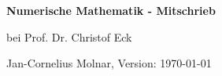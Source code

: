 \documentclass[paper=a5,fleqn,DIV=calc]{scrartcl}
\theoremstyle{graymarginwithblueheader}
\theoremstyle{graymarginwithyellowheader}
\theoremstyle{graymarginwithitblackheader}
\theoremstyle{graymarginwithblueheadern}
\theoremstyle{graymarginwithyellowheadern}
\theoremstyle{graymarginwithitblackheadern}
\begin{document}
\begin{center}
{\huge\bf Numerische Mathematik - Mitschrieb}

bei Prof. Dr. Christof Eck

Jan-Cornelius Molnar, Version: \today\ \thistime
\end{center}

\tableofcontents

\newpage


\newpage


\newpage


\newpage


\newpage

\end{document}
